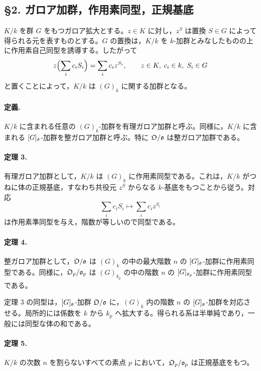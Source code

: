 \subsection*{§2. ガロア加群，作用素同型，正規基底}

\(K/k\) を群 \(G\) をもつガロア拡大とする。\(z\in K\) に対し，\(z^S\) は置換 \(S\in G\) によって得られる元を表すものとする。\(G\) の置換は，\(K/k\) を \(k\)-加群とみなしたものの上に作用素自己同型を誘導する。したがって
\[
        z\Bigl(\sum_i c_iS_i\Bigr)=\sum_i c_i z^{S_i},
        \qquad z\in K,\; c_i\in k,\; S_i\in G
\]
と置くことによって，\(K/k\) は \((G)_k\) に関する加群となる。

\paragraph{定義.}
\(K/k\) に含まれる任意の \((G)_k\)-加群を有理ガロア加群と呼ぶ。同様に，\(K/k\) に含まれる \([G]_{\mathfrak o}\)-加群を整ガロア加群と呼ぶ。特に \(\mathfrak O/\mathfrak o\) は整ガロア加群である。

\paragraph{定理 3.}
有理ガロア加群として，\(K/k\) は \((G)_k\) に作用素同型である。これは，\(K/k\) がつねに体の正規基底，すなわち共役元 \(z^S\) からなる \(k\)-基底をもつことから従う。対応
\[
        \sum_i c_iS_i\longmapsto \sum_i c_i z^{S_i}
\]
は作用素準同型を与え，階数が等しいので同型である。

\paragraph{定理 4.}
整ガロア加群として，\(\mathfrak O/\mathfrak o\) は \((G)_k\) の中の最大階数 \(n\) の \([G]_{\mathfrak o}\)-加群に作用素同型である。同様に，\(\mathfrak O_p/\mathfrak o_p\) は \((G)_{k_p}\) の中の階数 \(n\) の \([G]_{\mathfrak o_p}\)-加群に作用素同型である。

定理 3 の同型は，\([G]_{\mathfrak o}\)-加群 \(\mathfrak O/\mathfrak o\) に，\((G)_k\) 内の階数 \(n\) の \([G]_{\mathfrak o}\)-加群を対応させる。局所的には係数を \(k\) から \(k_p\) へ拡大する。得られる系は半単純であり，一般には同型な体の和である。

\paragraph{定理 5.}
\(K/k\) の次数 \(n\) を割らないすべての素点 \(p\) において，\(\mathfrak O_p/\mathfrak o_p\) は正規基底をもつ。

